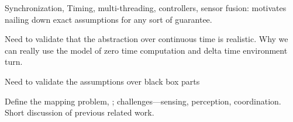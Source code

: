 Synchronization, Timing, multi-threading, controllers, sensor fusion:
motivates nailing down exact assumptions for any sort of guarantee.

Need to validate that the abstraction over continuous time is realistic.
Why we can really use the model of zero time computation and delta time environment turn.

Need to validate the assumptions over black box parts

%
Define the mapping problem, ; challenges---sensing, perception, coordination. Short discussion of previous related work.

%
%
